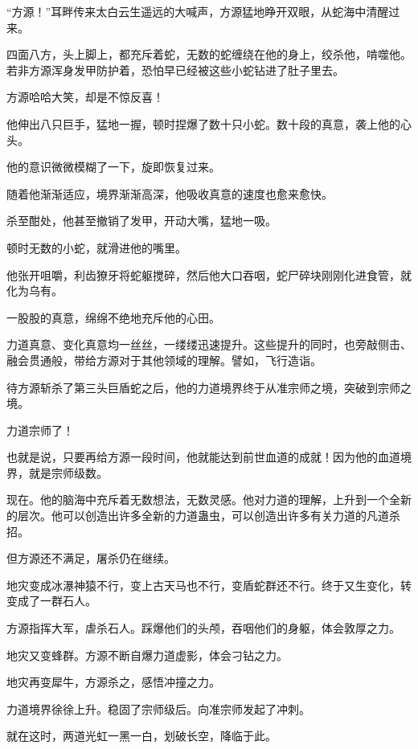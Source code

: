 
\begin{this_body}



“方源！”耳畔传来太白云生遥远的大喊声，方源猛地睁开双眼，从蛇海中清醒过来。

四面八方，头上脚上，都充斥着蛇，无数的蛇缠绕在他的身上，绞杀他，啃噬他。若非方源浑身发甲防护着，恐怕早已经被这些小蛇钻进了肚子里去。

方源哈哈大笑，却是不惊反喜！

他伸出八只巨手，猛地一握，顿时捏爆了数十只小蛇。数十段的真意，袭上他的心头。

他的意识微微模糊了一下，旋即恢复过来。

随着他渐渐适应，境界渐渐高深，他吸收真意的速度也愈来愈快。

杀至酣处，他甚至撤销了发甲，开动大嘴，猛地一吸。

顿时无数的小蛇，就滑进他的嘴里。

他张开咀嚼，利齿獠牙将蛇躯搅碎，然后他大口吞咽，蛇尸碎块刚刚化进食管，就化为乌有。

一股股的真意，绵绵不绝地充斥他的心田。

力道真意、变化真意均一丝丝，一缕缕迅速提升。这些提升的同时，也旁敲侧击、融会贯通般，带给方源对于其他领域的理解。譬如，飞行造诣。

待方源斩杀了第三头巨盾蛇之后，他的力道境界终于从准宗师之境，突破到宗师之境。

力道宗师了！

也就是说，只要再给方源一段时间，他就能达到前世血道的成就！因为他的血道境界，就是宗师级数。

现在。他的脑海中充斥着无数想法，无数灵感。他对力道的理解，上升到一个全新的层次。他可以创造出许多全新的力道蛊虫，可以创造出许多有关力道的凡道杀招。

但方源还不满足，屠杀仍在继续。

地灾变成冰瀑神猿不行，变上古天马也不行，变盾蛇群还不行。终于又生变化，转变成了一群石人。

方源指挥大军，虐杀石人。踩爆他们的头颅，吞咽他们的身躯，体会敦厚之力。

地灾又变蜂群。方源不断自爆力道虚影，体会刁钻之力。

地灾再变犀牛，方源杀之，感悟冲撞之力。

力道境界徐徐上升。稳固了宗师级后。向准宗师发起了冲刺。

就在这时，两道光虹一黑一白，划破长空，降临于此。


\end{this_body}
